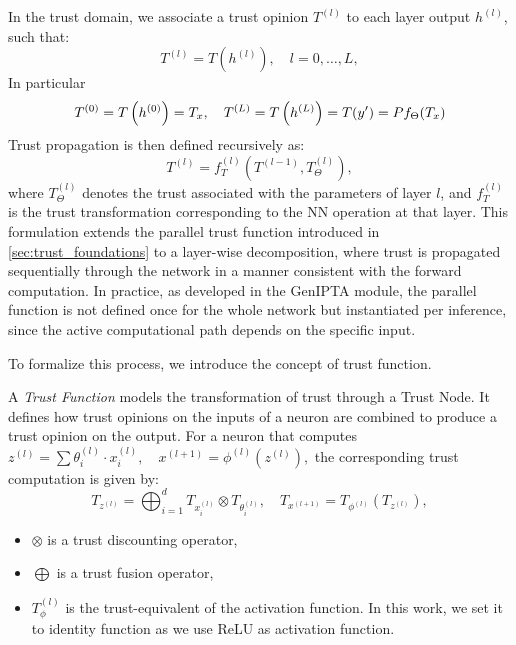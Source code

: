 In the trust domain, we associate a trust opinion $T^{(l)}$ to each layer output $h^{(l)}$, such that:
\[
T^{(l)} = T\left(h^{(l)}\right), \quad l = 0, \dots, L,
\]
In particular
\[
T^{(0)} = T\left(h^{(0)}\right) = T_x, \quad T^{(L)} = T\left(h^{(L)}\right) = T(y') = Pf_\Theta(T_x)\protect
\]
Trust propagation is then defined recursively as:
\[
T^{(l)} = f_T^{(l)}\left(T^{(l-1)}, T^{(l)}_{\Theta}\right),
\]
where $T^{(l)}_{\Theta}$ denotes the trust associated with the parameters of layer $l$, and $f_T^{(l)}$ is the trust transformation corresponding to the \ac{NN} operation at that layer. This formulation extends the parallel trust function introduced in \cref{sec:trust_foundations} to a layer-wise decomposition, where trust is propagated sequentially through the network in a manner consistent with the forward computation. In practice, as developed in the \ac{GenIPTA} module, the parallel function is not defined once for the whole network but instantiated per inference, since the active computational path depends on the specific input. 

To formalize this process, we introduce the concept of trust function.
\begin{definition}\label{def:trustfunc}
A \emph{Trust Function} models the transformation of trust through a Trust Node. It defines how trust opinions on the inputs of a neuron are combined to produce a trust opinion on the output. 
For a neuron that computes
\(
z^{(l)} = \sum \theta^{(l)}_i \cdot x^{(l)}_i, \quad x^{(l+1)} = \phi^{(l)}(z^{(l)}),
\)
the corresponding trust computation is given by:
\[
T_{z^{(l)}} = \bigoplus_{i=1}^{d} T_{x_{i}^{(l)}} \otimes T_{\theta_{i}^{(l)}}, \quad
T_{x^{(l+1)}} = T_{\phi^{(l)}}(T_{z^{(l)}}),
\]
\begin{itemize}
    \item \( \otimes \) is a trust discounting operator,
    \item \(\bigoplus\) is a trust fusion operator,
    \item \( T_{\phi}^{(l)} \) is the trust-equivalent of the activation function. In this work, we set it to identity function as we use ReLU as activation function.
\end{itemize}
\end{definition}

